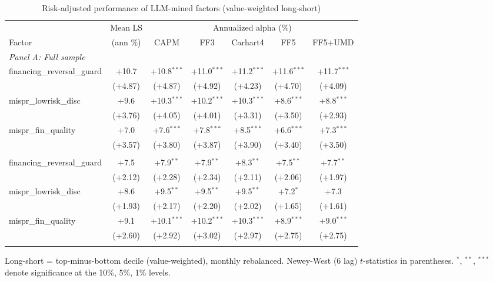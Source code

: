 \begin{table}[htbp]\centering
\caption{Risk-adjusted performance of LLM-mined factors (value-weighted long-short)}
\label{tab:alphas_vw}
\begin{threeparttable}\footnotesize
\begin{tabular}{lcccccc}
\toprule
 & Mean LS & \multicolumn{5}{c}{Annualized alpha (\%)} \\
\cmidrule(lr){3-7}
Factor & (ann \%) & CAPM & FF3 & Carhart4 & FF5 & FF5+UMD \\
\midrule
\multicolumn{7}{l}{\textit{Panel A: Full sample}} \\
\addlinespace
financing\_reversal\_guard & +10.7 & +10.8$^{***}$ & +11.0$^{***}$ & +11.2$^{***}$ & +11.6$^{***}$ & +11.7$^{***}$ \\
 & (+4.87) & (+4.87) & (+4.92) & (+4.23) & (+4.70) & (+4.09) \\
\addlinespace
mispr\_lowrisk\_disc & +9.6 & +10.3$^{***}$ & +10.2$^{***}$ & +10.3$^{***}$ & +8.6$^{***}$ & +8.8$^{***}$ \\
 & (+3.76) & (+4.05) & (+4.01) & (+3.31) & (+3.50) & (+2.93) \\
\addlinespace
mispr\_fin\_quality & +7.0 & +7.6$^{***}$ & +7.8$^{***}$ & +8.5$^{***}$ & +6.6$^{***}$ & +7.3$^{***}$ \\
 & (+3.57) & (+3.80) & (+3.87) & (+3.90) & (+3.40) & (+3.50) \\
\addlinespace
\midrule
\multicolumn{7}{l}{\textit{Panel B: Out-of-sample (post-2000-12-31)}} \\
\addlinespace
financing\_reversal\_guard & +7.5 & +7.9$^{**}$ & +7.9$^{**}$ & +8.3$^{**}$ & +7.5$^{**}$ & +7.7$^{**}$ \\
 & (+2.12) & (+2.28) & (+2.34) & (+2.11) & (+2.06) & (+1.97) \\
\addlinespace
mispr\_lowrisk\_disc & +8.6 & +9.5$^{**}$ & +9.5$^{**}$ & +9.5$^{**}$ & +7.2$^{*}$ & +7.3 \\
 & (+1.93) & (+2.17) & (+2.20) & (+2.02) & (+1.65) & (+1.61) \\
\addlinespace
mispr\_fin\_quality & +9.1 & +10.1$^{***}$ & +10.2$^{***}$ & +10.3$^{***}$ & +8.9$^{***}$ & +9.0$^{***}$ \\
 & (+2.60) & (+2.92) & (+3.02) & (+2.97) & (+2.75) & (+2.75) \\
\addlinespace
\bottomrule
\end{tabular}
\begin{tablenotes}\footnotesize
\item Long-short = top-minus-bottom decile (value-weighted), monthly rebalanced. Newey-West (6 lag) $t$-statistics in parentheses. $^{*}$, $^{**}$, $^{***}$ denote significance at the 10\%, 5\%, 1\% levels.
\end{tablenotes}
\end{threeparttable}
\end{table}